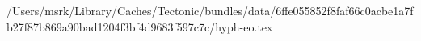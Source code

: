 /Users/msrk/Library/Caches/Tectonic/bundles/data/6ffe055852f8faf66c0acbe1a7fb27f87b869a90bad1204f3bf4d9683f597c7c/hyph-eo.tex